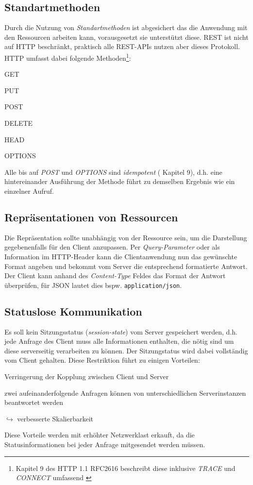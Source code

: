 \subsection{Standartmethoden}

Durch die Nutzung von \emph{Standartmethoden} ist abgesichert das die Anwendung mit den Ressourcen arbeiten kann, vorausgesetzt sie unterstützt diese. \gls{REST} ist nicht auf HTTP beschränkt, praktisch alle REST-APIs nutzen aber dieses Protokoll. HTTP umfasst dabei folgende Methoden\footnote{Kapitel 9 des HTTP 1.1 RFC2616 beschreibt diese inklusive \emph{TRACE} und \emph{CONNECT} umfassend \cite{HTTP11RFC}}:
\begin{compactitem}
    \item GET
    \item PUT
    \item POST
    \item DELETE
    \item HEAD
    \item OPTIONS
\end{compactitem}

Alle bis auf \emph{POST} und \emph{OPTIONS} sind \emph{idempotent} (\cite{HTTP11RFC} Kapitel 9), d.h. eine hintereinander Ausführung der Methode führt zu demselben Ergebnis wie ein einzelner Aufruf.

\subsection{Repräsentationen von Ressourcen}
\label{sec:representationofresources}

Die Repräsentation sollte unabhängig von der Ressource sein, um die Darstellung gegebenenfalls für den Client anzupassen. Per \emph{Query-Parameter} oder als Information im HTTP-Header kann die Clientanwendung nun das gewünschte Format angeben und bekommt vom Server die entsprechend formatierte Antwort. Der Client kann anhand des \emph{Content-Type} Feldes das Format der Antwort überprüfen, für \gls{JSON} lautet dies bspw. \texttt{application/json}.

\subsection{Statuslose Kommunikation}

Es soll kein Sitzungsstatus (\emph{session-state}) vom Server gespeichert werden, d.h. jede Anfrage des Client muss alle Informationen enthalten, die nötig sind um diese serverseitig verarbeiten zu können. Der Sitzungstatus wird dabei vollständig vom Client gehalten. Diese Restriktion führt zu einigen Vorteilen:
\begin{compactitem}
	\item Verringerung der Kopplung zwischen Client und Server
	\item zwei aufeinanderfolgende Anfragen können von unterschiedlichen Serverinstanzen beantwortet werden
	\item[$\hookrightarrow$] verbesserte Skalierbarkeit
\end{compactitem}
Diese Vorteile werden mit erhöhter Netzwerklast erkauft, da die Statusinformationen bei jeder Anfrage mitgesendet werden müssen.


